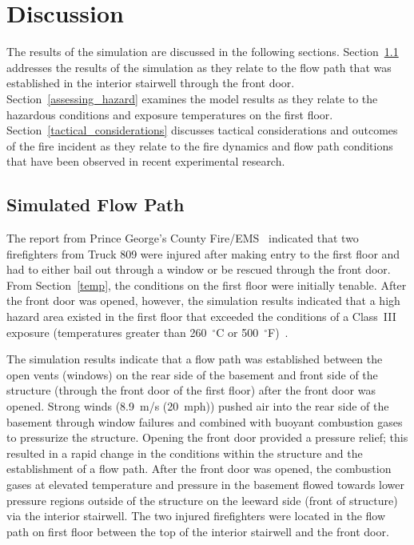 \documentclass[12pt,oneside]{book}
\begin{document}
\clearpage

\chapter{Discussion}
\label{discuss}
The results of the simulation are discussed in the following sections. Section~\ref{simulated_flow_path} addresses the results of the simulation as they relate to the flow path that was established in the interior stairwell through the front door. Section~\ref{assessing_hazard} examines the model results as they relate to the hazardous conditions and exposure temperatures on the first floor. Section~\ref{tactical_considerations} discusses tactical considerations and outcomes of the fire incident as they relate to the fire dynamics and flow path conditions that have been observed in recent experimental research.

\section{Simulated Flow Path}
\label{simulated_flow_path}

The report from Prince George's County Fire/EMS~\cite{PGCounty2013} indicated that two firefighters from Truck 809 were injured after making entry to the first floor and had to either bail out through a window or be rescued through the front door. From Section~\ref{temp}, the conditions on the first floor were initially tenable. After the front door was opened, however, the simulation results indicated that a high hazard area existed in the first floor that exceeded the conditions of a Class~III exposure (temperatures greater than 260~$^{\circ}$C or 500~$^{\circ}$F)~\cite{Donnelly2006}.

The simulation results indicate that a flow path was established between the open vents (windows) on the rear side of the basement and front side of the structure (through the front door of the first floor) after the front door was opened. Strong winds (8.9~m/s (20~mph)) pushed air into the rear side of the basement through window failures and combined with buoyant combustion gases to pressurize the structure. Opening the front door provided a pressure relief; this resulted in a rapid change in the conditions within the structure and the establishment of a flow path. After the front door was opened, the combustion gases at elevated temperature and pressure in the basement flowed towards lower pressure regions outside of the structure on the leeward side (front of structure) via the interior stairwell. The two injured firefighters were located in the flow path on first floor between the top of the interior stairwell and the front door.
\end{document}
